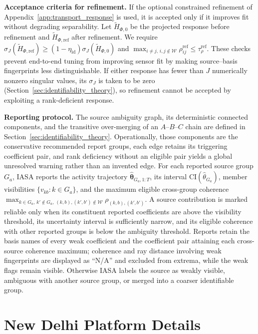 \noindent\textbf{Acceptance criteria for refinement.}
If the optional constrained refinement of
Appendix~\ref{app:transport_response} is used, it is accepted only if it improves
fit without degrading separability.  Let \(\widetilde H_{\Phi,0}\) be the
projected response before refinement and \(\widetilde H_{\Phi,\mathrm{ref}}\)
after refinement.  We require
\(\sigma_J(\widetilde H_{\Phi,\mathrm{ref}})\ge
(1-\eta_{\mathrm{id}})\sigma_J(\widetilde H_{\Phi,0})\) and
\(\max_{i\ne j,\,i,j\notin\mathcal W}\rho_{ij}^{\mathrm{ref}}\le
\tau_\rho^{\mathrm{ref}}\).  These checks prevent end-to-end tuning from improving
sensor fit by making source--basis fingerprints less distinguishable.  If either
response has fewer than \(J\) numerically nonzero singular values, its
\(\sigma_J\) is taken to be zero
(Section~\ref{sec:identifiability_theory}), so refinement cannot be
accepted by exploiting a rank-deficient response.

\noindent\textbf{Reporting protocol.}
The source ambiguity graph, its deterministic connected components, and the
transitive over-merging of an \(A\)--\(B\)--\(C\) chain are defined in
Section~\ref{sec:identifiability_theory}.  Operationally, those components are the
conservative recommended report groups, each edge retains its triggering
coefficient pair, and rank deficiency without an eligible pair yields a global
unresolved warning rather than an invented edge.  For each reported source group
\(G_a\), IASA reports the activity trajectory
\(\widehat{\boldsymbol\theta}_{G_a,1:T}\), its interval
\(\mathrm{CI}(\widehat\theta_{G_a})\), member visibilities
\(\{v_{kb}:k\in G_a\}\), and the maximum eligible cross-group coherence
\(\max_{k\in G_a,\,k'\notin G_a,\,(k,b),(k',b')\notin\mathcal W}
\rho_{(k,b),(k',b')}\).  A source contribution is marked reliable only when its
constituent reported coefficients are above the visibility threshold, its
uncertainty interval is sufficiently narrow, and its eligible coherence with
other reported groups is below the ambiguity threshold.  Reports retain the basis
names of every weak coefficient and the coefficient pair attaining each
cross-source coherence maximum; coherence and ray distance involving weak
fingerprints are displayed as ``N/A'' and excluded from extrema, while the weak
flags remain visible.  Otherwise IASA labels the source as weakly visible,
ambiguous with another source group, or merged into a coarser identifiable group.

\section{New Delhi Platform Details}
\label{app:platform_details}

